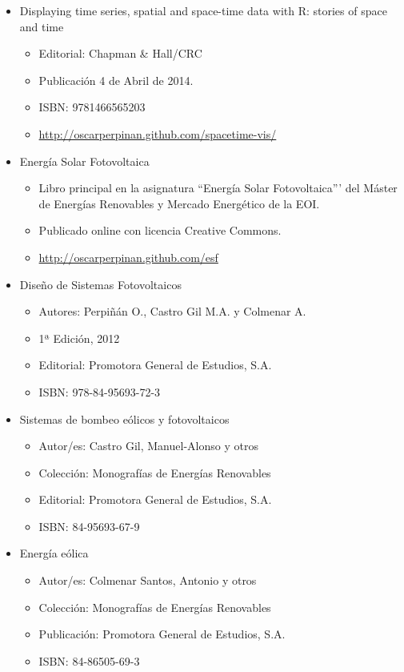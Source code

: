 \documentclass[article, a4paper]{memoir}
\begin{document}
\begin{itemize}
\item Displaying time series, spatial and space-time data with R: stories of space and time
\begin{itemize}
\item Editorial: Chapman \& Hall/CRC
\item Publicación 4 de Abril de 2014.
\item ISBN: 9781466565203
\item \url{http://oscarperpinan.github.com/spacetime-vis/}
\end{itemize}

\item Energía Solar Fotovoltaica

\begin{itemize}
\item Libro principal en la asignatura ``Energía Solar Fotovoltaica''' del Máster de Energías Renovables y Mercado Energético de la EOI.
\item Publicado online con licencia Creative Commons.
\item \url{http://oscarperpinan.github.com/esf}
\end{itemize}

\item Diseño de Sistemas Fotovoltaicos

\begin{itemize}
\item Autores: Perpiñán O., Castro Gil M.A. y Colmenar A.
\item 1ª Edición, 2012
\item Editorial: Promotora General de Estudios, S.A.
\item ISBN: 978-84-95693-72-3
\end{itemize}

\item Sistemas de bombeo eólicos y fotovoltaicos

\begin{itemize}
\item Autor/es: Castro Gil, Manuel-Alonso y otros
\item Colección: Monografías de Energías Renovables
\item Editorial: Promotora General de Estudios, S.A.
\item ISBN: 84-95693-67-9
\end{itemize}

\item Energía eólica

\begin{itemize}
\item Autor/es: Colmenar Santos, Antonio y otros
\item Colección: Monografías de Energías Renovables
\item Publicación: Promotora General de Estudios, S.A.
\item ISBN: 84-86505-69-3
\end{itemize}
\end{itemize}
\end{document}
